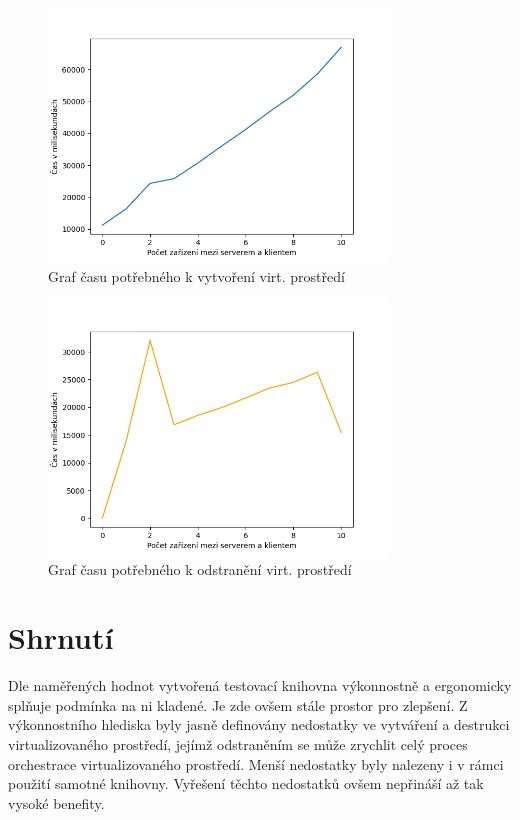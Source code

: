 \begin{figure}[htbp]
    \centering 
    \includegraphics[width=0.8\textwidth]{assets/img/graphs/graph_start.png}
    \caption{Graf času potřebného k vytvoření virt. prostředí}
    \label{fig:graph_create}
\end{figure}



\begin{figure}[htbp]
    \centering 
    \includegraphics[width=0.8\textwidth]{assets/img/graphs/graph_remove.png}
    \caption{Graf času potřebného k odstranění virt. prostředí}
    \label{fig:graph_remove}
\end{figure}


\section{Shrnutí}

Dle naměřených hodnot vytvořená testovací knihovna výkonnostně a ergonomicky splňuje podmínka na ni kladené. Je zde ovšem stále prostor pro zlepšení. Z výkonnostního hlediska byly jasně definovány nedostatky ve vytváření a destrukci virtualizovaného prostředí, jejímž odstraněním se může zrychlit celý proces orchestrace virtualizovaného prostředí. Menší nedostatky byly nalezeny i v rámci použití samotné knihovny. Vyřešení těchto nedostatků ovšem nepřináší až tak vysoké benefity.


